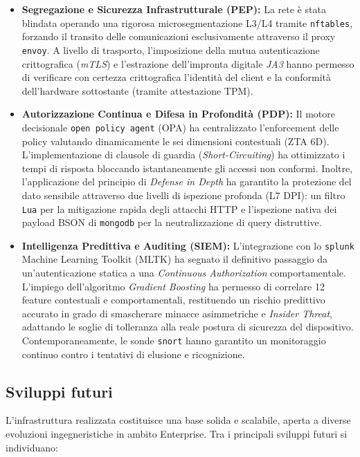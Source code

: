 \begin{itemize}
    \item \textbf{Segregazione e Sicurezza Infrastrutturale (PEP):} La rete è stata blindata operando una rigorosa microsegmentazione L3/L4 tramite \texttt{nftables}, forzando il transito delle comunicazioni esclusivamente attraverso il proxy \texttt{envoy}. A livello di trasporto, l'imposizione della mutua autenticazione crittografica (\textit{mTLS}) e l'estrazione dell'impronta digitale \textit{JA3} hanno permesso di verificare con certezza crittografica l'identità del client e la conformità dell'hardware sottostante (tramite attestazione TPM).
    
    \item \textbf{Autorizzazione Continua e Difesa in Profondità (PDP):} Il motore decisionale \texttt{open policy agent} (OPA) ha centralizzato l'enforcement delle policy valutando dinamicamente le sei dimensioni contestuali (ZTA 6D). L'implementazione di clausole di guardia (\textit{Short-Circuiting}) ha ottimizzato i tempi di risposta bloccando istantaneamente gli accessi non conformi. Inoltre, l'applicazione del principio di \textit{Defense in Depth} ha garantito la protezione del dato sensibile attraverso due livelli di ispezione profonda (L7 DPI): un filtro \texttt{Lua} per la mitigazione rapida degli attacchi HTTP e l'ispezione nativa dei payload BSON di \texttt{mongodb} per la neutralizzazione di query distruttive.
    
    \item \textbf{Intelligenza Predittiva e Auditing (SIEM):} L'integrazione con lo \texttt{splunk} Machine Learning Toolkit (MLTK) ha segnato il definitivo passaggio da un'autenticazione statica a una \textit{Continuous Authorization} comportamentale. L'impiego dell'algoritmo \textit{Gradient Boosting} ha permesso di correlare 12 feature contestuali e comportamentali, restituendo un rischio predittivo accurato in grado di smascherare minacce asimmetriche e \textit{Insider Threat}, adattando le soglie di tolleranza alla reale postura di sicurezza del dispositivo. Contemporaneamente, le sonde \texttt{snort} hanno garantito un monitoraggio continuo contro i tentativi di elusione e ricognizione.
\end{itemize}

\subsection{Sviluppi futuri}
L'infrastruttura realizzata costituisce una base solida e scalabile, aperta a diverse evoluzioni ingegneristiche in ambito Enterprise. Tra i principali sviluppi futuri si individuano:

